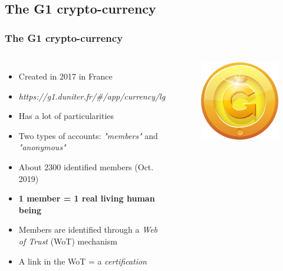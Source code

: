 \documentclass{beamer}
\begin{document}
\subsection{The G1 crypto-currency}

\begin{frame}
	\frametitle{The G1 crypto-currency}
	\begin{columns}[c]
		\begin{itemize}
			\item<1-> Created in 2017 in France
			\item<1-> \textit{https://g1.duniter.fr/\#/app/currency/lg}
			\item<2-> Has a lot of 
particularities
			\item<3-> Two types of accounts: \textit{"members"} and \textit{"anonymous"}
			\item<4-> About 2300 identified members (Oct. 2019)
			\item<5-> \textbf{1 member = 1 real living human being}
			\item<6-> Members are identified through a \textit{Web of Trust} (WoT) mechanism
			\item<7-> A link in the WoT = a \textit{certification}
		\end{itemize}
			\begin{figure}
				\includegraphics[width=.5\linewidth]{./figures/g1_logo}
			\end{figure}
\end{columns}
\end{frame}
\end{document}
